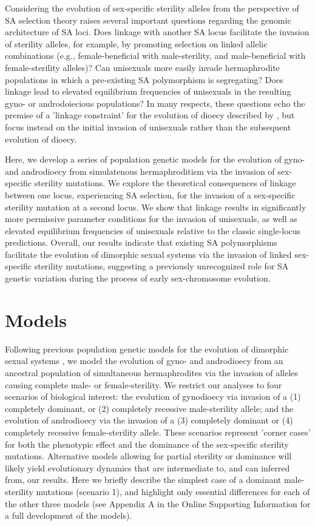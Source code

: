 \documentclass[9pt,twocolumn,twoside,lineno]{gsajnl}
\begin{document}
Considering the evolution of sex-specific sterility alleles from the perspective of SA selection theory raises several important questions regarding the genomic architecture of SA loci. Does linkage with another SA locus facilitate the invasion of sterility alleles, for example, by promoting selection on linked allelic combinations (e.g., female-beneficial with male-sterility, and male-beneficial with female-sterility alleles)? Can unisexuals more easily invade hermaphrodite populations in which a pre-existing SA polymorphism is segregating? Does linkage lead to elevated equilibrium frequencies of unisexuals in the resulting gyno- or androdoiecious populations? In many respects, these questions echo the premise of a 'linkage constraint' for the evolution of dioecy described by \citet{Charlesworth1978a}, but focus instead on the initial invasion of unisexuals rather than the subsequent evolution of dioecy. 

Here, we develop a series of population genetic models for the evolution of gyno- and androdioecy from simulatenous hermaphroditism via the invasion of sex-specific sterility mutations. We explore the theoretical consequences of linkage between one locus, experiencing SA selection, for the invasion of a sex-specific sterility mutation at a second locus. We show that linkage results in significantly more permissive parameter conditions for the invasion of unisexuals, as well as elevated equilibrium frequencies of unisexuals relative to the classic single-locus predictions. Overall, our results indicate that existing SA polymorphisms facilitate the evolution of dimorphic sexual systems via the invasion of linked sex-specific sterility mutations, suggesting a previously unrecognized role for SA genetic variation during the process of early sex-chromosome evolution.


\section{Models} \label{sec:methods}

Following previous population genetic models for the evolution of dimorphic sexual systems \citep{Charlesworth1978a}, we model the evolution of gyno- and androdioecy from an ancestral population of simultaneous hermaphrodites via the invasion of alleles causing complete male- or female-sterility. We restrict our analyses to four scenarios of biological interest: the evolution of gynodioecy via invasion of a (1) completely dominant, or (2) completely recessive male-sterility allele; and the evolution of androdioecy via the invasion of a (3) completely dominant or (4) completely recessive female-sterility allele. These scenarios represent 'corner cases' for both the phenotypic effect and the dominance of the sex-specific sterility mutations. Alternative models allowing for partial sterility or dominance will likely yield evolutionary dynamics that are intermediate to, and can inferred from, our results. Here we briefly describe the simplest case of a dominant male-sterility mutations (scenario 1), and highlight only essential differences for each of the other three models (see Appendix A in the Online Supporting Information for a full development of the models). 
\end{document}
